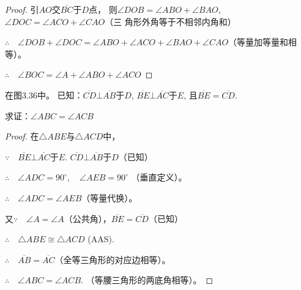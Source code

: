\begin{proof}
 引$AO$交$\overline{BC}$于$D$点，
则$\angle DOB=\angle ABO+\angle BAO$, 
$\angle DOC=\angle ACO+\angle CAO$（三
角形外角等于不相邻内角和）

$\therefore\quad \angle DOB+\angle DOC=\angle ABO+\angle ACO+
\angle BAO+\angle CAO$（等量加等量和相等）。

$\therefore\quad \angle BOC=\angle A+\angle ABO+\angle ACO$
\end{proof}

\begin{figure}[htp]\centering
    \begin{minipage}[t]{0.48\textwidth}
    \centering
{}
    \caption{}
    \end{minipage}
    \begin{minipage}[t]{0.48\textwidth}
    \centering
    \caption{}
    \end{minipage}
    \end{figure}


\begin{example}
    在图3.36中。
    已知：$\overline{CD}\bot\overline{AB}$于$D$, $\overline{BE}\bot\overline{AC}$于$E$, 且$\overline{BE}=\overline{CD}$.

    求证：$\angle ABC=\angle ACB$
\end{example}

\begin{proof}
    在$\triangle ABE$与$\triangle ACD$中，

$\because\quad  \overline{BE}\bot\overline{AC}$于$E$. $\overline{CD}\bot\overline{AB}$于$D$（已知）

$\therefore\quad \angle ADC=90^{\circ},\quad \angle AEB=90^{\circ}$
（垂直定义）。

$\therefore\quad \angle ADC=\angle AEB$（等量代换）。

又$\because\quad \angle A=\angle A$（公共角），$\overline{BE}=\overline{CD}$（已知）

$\therefore\quad \triangle ABE\cong \triangle ACD$ (AAS).

$\therefore\quad \overline{AB}=\overline{AC}$（全等三角形的对应边相等）。

$\therefore\quad \angle ABC=\angle ACB$. （等腰三角形的两底角相等）。
\end{proof}

